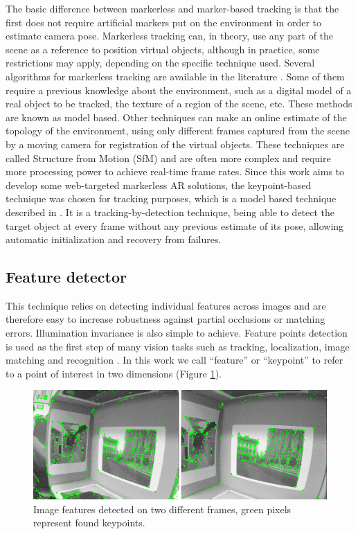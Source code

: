 The basic difference between markerless and marker-based tracking is that the first does not require artificial markers put on the environment in order to estimate camera pose. Markerless tracking can, in theory, use any part of the scene as a reference to position virtual objects, although in practice, some restrictions may apply, depending on the specific technique used. Several algorithms for markerless tracking are available in the literature \cite{Teichrieb2007}. Some of them require a previous knowledge about the environment, such as a digital model of a real object to be tracked, the texture of a region of the scene, etc. These methods are known as model based. Other techniques can make an online estimate of the topology of the environment, using only different frames captured from the scene by a moving camera for registration of the virtual objects. These techniques are called Structure from Motion (SfM) and are often more complex and require more processing power to achieve real-time frame rates. Since this work aims to develop some web-targeted markerless AR solutions, the keypoint-based technique was chosen for tracking purposes, which is a model based technique described in \cite{Teichrieb2010}. It is a tracking-by-detection technique, being able to detect the target object at every frame without any previous estimate of its pose, allowing automatic initialization and recovery from failures.


\subsection{Feature detector} %
\label{sub:tracking_library_for_the_web:marker_less_tracking_algorithm:feature_detector}

This technique relies on detecting individual features across images and are therefore easy to increase robustness against partial occlusions or matching errors. Illumination invariance is also simple to achieve. Feature points detection is used as the first step of many vision tasks such as tracking, localization, image matching and recognition \cite{Lepetit2005}. In this work we call ``feature'' or ``keypoint'' to refer to a point of interest in two dimensions (Figure \ref{figure:keypoints}).

\begin{figure}[!htb]
  \centering
  \includegraphics[width=380pt]{chapters/tracking_library_for_the_web/keypoints.png}
  \caption{Image features detected on two different frames, green pixels represent found keypoints.}
  \label{figure:keypoints}
\end{figure}

